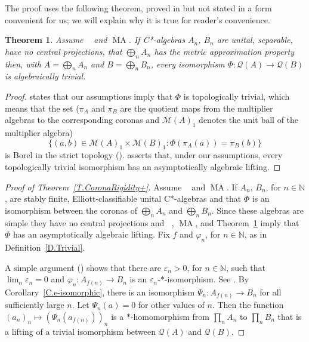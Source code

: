 \documentclass[11pt]{amsproc}
\newcommand{\bbN}{\mathbb N}
\newcommand{\cstar}{C*}
\newcommand{\cM}{\mathcal M}
\newcommand{\cQ}{\mathcal Q}
\DeclareMathOperator{\OCAT}{OCA_T}
\DeclareMathOperator{\MA}{MA}
\theoremstyle{definition}
\theoremstyle{plain}
\newtheorem{theorem}[definition]{Theorem}
\theoremstyle{remark}
\begin{document}
The proof uses the following theorem, proved in \cite{mckenney2020forcing} but not stated in a form convenient for us; we will explain why it is true for reader's convenience. 

\begin{theorem}\label{T.McKV}
Assume $\OCAT$ and $\MA$.  If \cstar-algebras $A_n$, $B_n$ are unital, separable, have no central projections, that $\bigoplus_n A_n$ has the metric approximation property   then, with $A=\bigoplus_n A_n$ and $B=\bigoplus_n B_n$, every isomorphism $\Phi\colon \cQ(A)\to \cQ(B)$ is algebraically trivial. 
\end{theorem}

\begin{proof}  \cite[Theorem~C]{mckenney2020forcing} states that our assumptions imply that $\Phi$ is topologically trivial, which means that the set ($\pi_A$ and $\pi_B$ are the quotient maps from the multiplier algebras to the corresponding coronas and $\cM(A)_1$ denotes the unit ball of the multiplier algebra)
\[
\{(a,b)\in \cM(A)_1\times\cM(B)_1: \Phi(\pi_A(a))=\pi_B(b)\}
\]
is Borel in the strict topology (\cite[Definition~A]{mckenney2020forcing}).   \cite[Theorem~E]{mckenney2020forcing} asserts that, under our assumptions, every topologically trivial isomorphism has an asymptotically algebraic lifting. 
\end{proof}


\begin{proof}[Proof of Theorem~\ref{T.CoronaRigidity+}]
	Assume $\OCAT$ and $\MA$. 
	If $A_n$, $B_n$, for $n\in \bbN$, are stably finite,  Elliott-classifiable unital \cstar-algebras and that $\Phi$ is an isomorphism between the coronas of $\bigoplus_n A_n$ and $\bigoplus_n B_n$. 
Since these algebras are simple they have no central projections and 	
 $\OCAT$, $\MA$, and Theorem~\ref{T.McKV} imply that $\Phi$ has an asymptotically algebraic lifting. Fix $f$ and $\varphi_n$, for $n\in \bbN$, as in Definition~\ref{D.Trivial}. 

A simple argument (\cite[Lemma 3.12]{mckenney2020forcing}) shows that there are $\varepsilon_n>0$, for $n\in \bbN$,   such  that $\lim_n \varepsilon_n=0$ and $\varphi_n\colon A_{f(n)}\to B_n$ is an $\varepsilon_n$-$*$-isomorphism. See  \cite[Theorem~3.16]{mckenney2020forcing}.  By Corollary~\ref{C.e-isomorphic}, there is an isomorphism $\Psi_n\colon A_{f(n)}\to B_n$ for all sufficiently large $n$. Let $\Psi_n(a)=0$ for other values of $n$.  Then the function $(a_n)_n\mapsto (\Psi_n(a_{f(n)}))_n $ is a $*$-homomorphism from $\prod_n A_n$ to $\prod_n B_n$ that is a lifting of a trivial isomorphism between $\cQ(A)$ and $\cQ(B)$. 
\end{proof}
\end{document}

